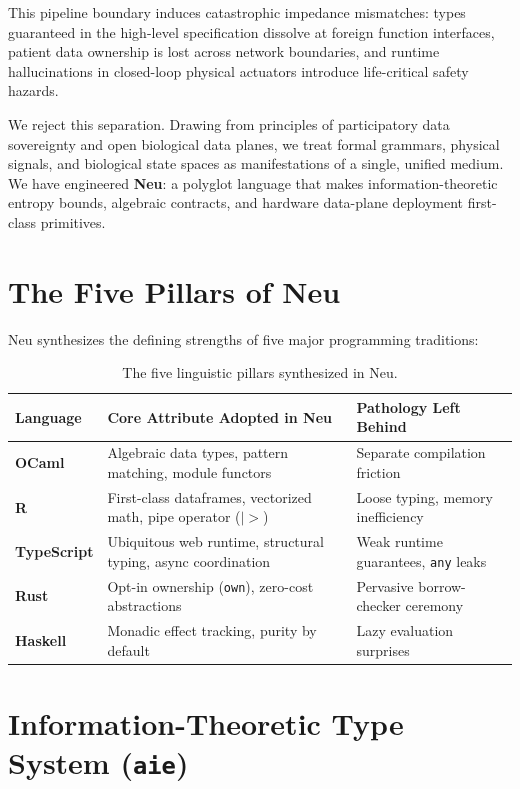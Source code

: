 \documentclass[11pt]{article}
\begin{document}
This pipeline boundary induces catastrophic impedance mismatches: types guaranteed in the high-level specification dissolve at foreign function interfaces, patient data ownership is lost across network boundaries, and runtime hallucinations in closed-loop physical actuators introduce life-critical safety hazards.

We reject this separation. Drawing from principles of participatory data sovereignty and open biological data planes, we treat formal grammars, physical signals, and biological state spaces as manifestations of a single, unified medium. We have engineered \textbf{Neu}: a polyglot language that makes information-theoretic entropy bounds, algebraic contracts, and hardware data-plane deployment first-class primitives.

\section{The Five Pillars of Neu}

Neu synthesizes the defining strengths of five major programming traditions:

\begin{table}[h]
\centering
\small
\begin{tabular}{lll}
\toprule
\textbf{Language} & \textbf{Core Attribute Adopted in Neu} & \textbf{Pathology Left Behind} \\
\midrule
\textbf{OCaml} & Algebraic data types, pattern matching, module functors & Separate compilation friction \\
\textbf{R} & First-class dataframes, vectorized math, pipe operator ($|{>}$) & Loose typing, memory inefficiency \\
\textbf{TypeScript} & Ubiquitous web runtime, structural typing, async coordination & Weak runtime guarantees, \texttt{any} leaks \\
\textbf{Rust} & Opt-in ownership (\texttt{own}), zero-cost abstractions & Pervasive borrow-checker ceremony \\
\textbf{Haskell} & Monadic effect tracking, purity by default & Lazy evaluation surprises \\
\bottomrule
\end{tabular}
\caption{The five linguistic pillars synthesized in Neu.}
\label{tab:five_pillars}
\end{table}

\section{Information-Theoretic Type System (\texttt{aie})}
\end{document}
